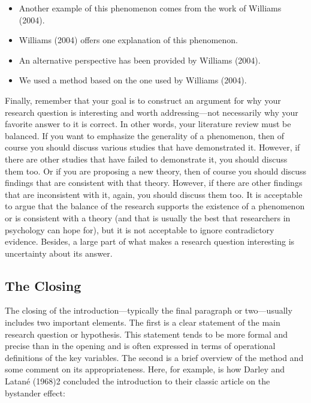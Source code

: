 \begin{itemize}
\item 
Another example of this phenomenon comes from the work of Williams (2004).

\item Williams (2004) offers one explanation of this phenomenon.

\item An alternative perspective has been provided by Williams (2004).

\item We used a method based on the one used by Williams (2004).

\end{itemize}



Finally, remember that your goal is to construct an argument for why your research question is interesting and worth addressing---not necessarily why your favorite answer to it is correct. In other words, your literature review must be balanced. If you want to emphasize the generality of a phenomenon, then of course you should discuss various studies that have demonstrated it. However, if there are other studies that have failed to demonstrate it, you should discuss them too. Or if you are proposing a new theory, then of course you should discuss findings that are consistent with that theory. However, if there are other findings that are inconsistent with it, again, you should discuss them too. It is acceptable to argue that the balance of the research supports the existence of a phenomenon or is consistent with a theory (and that is usually the best that researchers in psychology can hope for), but it is not acceptable to ignore contradictory evidence. Besides, a large part of what makes a research question interesting is uncertainty about its answer.




\subsection{The Closing}



The closing of the introduction---typically the final paragraph or two---usually includes two important elements. The first is a clear statement of the main research question or hypothesis. This statement tends to be more formal and precise than in the opening and is often expressed in terms of operational definitions of the key variables. The second is a brief overview of the method and some comment on its appropriateness. Here, for example, is how Darley and Latané (1968)2 concluded the introduction to their classic article on the bystander effect:




